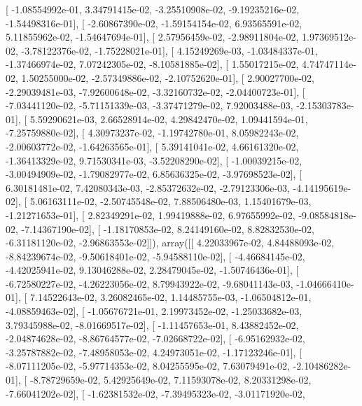 \documentclass{article}
\begin{document}
       [ -1.08554992e-01,   3.34791415e-02,  -3.25510908e-02,
         -9.19235216e-02,  -1.54498316e-01],
       [ -2.60867390e-02,  -1.59154154e-02,   6.93565591e-02,
          5.11855962e-02,  -1.54647694e-01],
       [  2.57956459e-02,  -2.98911804e-02,   1.97369512e-02,
         -3.78122376e-02,  -1.75228021e-01],
       [  4.15249269e-03,  -1.03484337e-01,  -1.37466974e-02,
          7.07242305e-02,  -8.10581885e-02],
       [  1.55017215e-02,   4.74747114e-02,   1.50255000e-02,
         -2.57349886e-02,  -2.10752620e-01],
       [  2.90027700e-02,  -2.29039481e-03,  -7.92600648e-02,
         -3.32160732e-02,  -2.04400723e-01],
       [ -7.03441120e-02,  -5.71151339e-03,  -3.37471279e-02,
          7.92003488e-03,  -2.15303783e-01],
       [  5.59290621e-03,   2.66528914e-02,   4.29842470e-02,
          1.09441594e-01,  -7.25759880e-02],
       [  4.30973237e-02,  -1.19742780e-01,   8.05982243e-02,
         -2.00603772e-02,  -1.64263565e-01],
       [  5.39141041e-02,   4.66161320e-02,  -1.36413329e-02,
          9.71530341e-03,  -3.52208290e-02],
       [ -1.00039215e-02,  -3.00494909e-02,  -1.79082977e-02,
          6.85636325e-02,  -3.97698523e-02],
       [  6.30181481e-02,   7.42080343e-03,  -2.85372632e-02,
         -2.79123306e-03,  -4.14195619e-02],
       [  5.06163111e-02,  -2.50745548e-02,   7.88506480e-03,
          1.15401679e-03,  -1.21271653e-01],
       [  2.82349291e-02,   1.99419888e-02,   6.97655992e-02,
         -9.08584818e-02,  -7.14367190e-02],
       [ -1.18170853e-02,   8.24149160e-02,   8.82832530e-02,
         -6.31181120e-02,  -2.96863553e-02]]), array([[  4.22033967e-02,   4.84488093e-02,  -8.84239674e-02,
         -9.50618401e-02,  -5.94588110e-02],
       [ -4.46684145e-02,  -4.42025941e-02,   9.13046288e-02,
          2.28479045e-02,  -1.50746436e-01],
       [ -6.72580227e-02,  -4.26223056e-02,   8.79943922e-02,
         -9.68041143e-03,  -1.04666410e-01],
       [  7.14522643e-02,   3.26082465e-02,   1.14485755e-03,
         -1.06504812e-01,  -4.08859463e-02],
       [ -1.05676721e-01,   2.19973452e-02,  -1.25033682e-03,
          3.79345988e-02,  -8.01669517e-02],
       [ -1.11457653e-01,   8.43882452e-02,  -2.04874628e-02,
         -8.86764577e-02,  -7.02668722e-02],
       [ -6.95162932e-02,  -3.25787882e-02,  -7.48958053e-02,
          4.24973051e-02,  -1.17123246e-01],
       [ -8.07111205e-02,  -5.97714353e-02,   8.04255595e-02,
          7.63079491e-02,  -2.10486282e-01],
       [ -8.78729659e-02,   5.42925649e-02,   7.11593078e-02,
          8.20331298e-02,  -7.66041202e-02],
       [ -1.62381532e-02,  -7.39495323e-02,  -3.01171920e-02,
\end{document}
